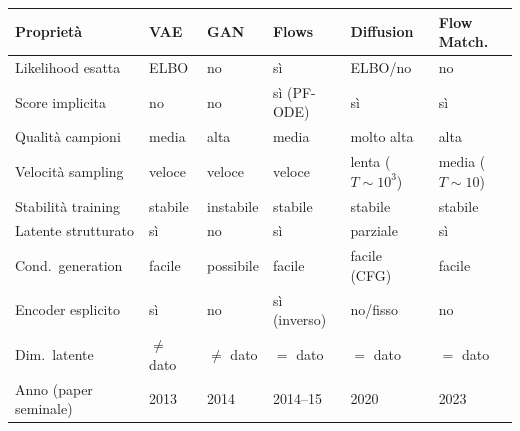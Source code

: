 \begin{tcolorbox}[mybox, title={Confronto modelli generativi profondi}, breakable]
\small
\begin{tabular}{p{2.6cm} p{1.5cm} p{1.5cm} p{1.6cm} p{1.7cm} p{1.7cm}}
\toprule
\textbf{Proprietà} & \textbf{VAE} & \textbf{GAN} & \textbf{Flows} & \textbf{Diffusion} & \textbf{Flow Match.}\\
\midrule
Likelihood esatta & ELBO & no & sì & ELBO/no & no\\
Score implicita & no & no & sì (PF-ODE) & sì & sì\\
Qualità campioni & media & alta & media & molto alta & alta\\
Velocità sampling & veloce & veloce & veloce & lenta ($T\!\sim\!10^3$) & media ($T\!\sim\!10$)\\
Stabilità training & stabile & instabile & stabile & stabile & stabile\\
Latente strutturato & sì & no & sì & parziale & sì\\
Cond.\ generation & facile & possibile & facile & facile (CFG) & facile\\
Encoder esplicito & sì & no & sì (inverso) & no/fisso & no\\
Dim.\ latente & $\neq$ dato & $\neq$ dato & $=$ dato & $=$ dato & $=$ dato\\
Anno (paper seminale) & 2013 & 2014 & 2014--15 & 2020 & 2023\\
\bottomrule
\end{tabular}
\end{tcolorbox}

\bigskip

